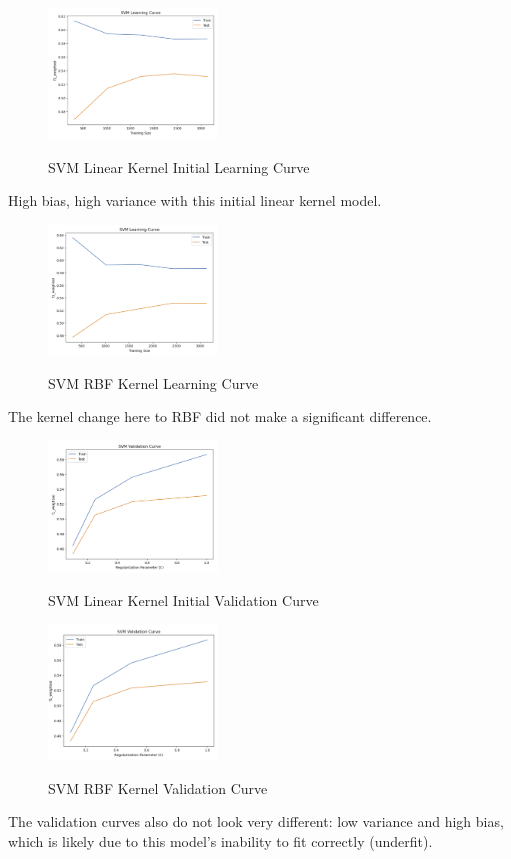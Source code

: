 \documentclass[conference]{IEEEtran}
\begin{document}
\begin{figure}[H]
    \centering
    \includegraphics[width=0.40\textwidth]{Red Wine Quality Graph Images/SVC/svm lin lc init.png}
    \label{fig:enter-label}
    \caption{SVM Linear Kernel Initial Learning Curve}
\end{figure}
High bias, high variance with this initial linear kernel model. 

\begin{figure}[H]
    \centering
    \includegraphics[width=0.40\textwidth]{Red Wine Quality Graph Images/SVC/svm rbf lc.png}
    \label{fig:enter-label}
    \caption{SVM RBF Kernel Learning Curve}
\end{figure}
The kernel change here to RBF did not make a significant difference.

\begin{figure}[H]
    \centering
    \includegraphics[width=0.40\textwidth]{Red Wine Quality Graph Images/SVC/svm lin vc init.png}
    \label{fig:enter-label}
    \caption{SVM Linear Kernel Initial Validation Curve}
\end{figure}

\begin{figure}[H]
    \centering
    \includegraphics[width=0.40\textwidth]{Red Wine Quality Graph Images/SVC/svm rbf vc.png}
    \label{fig:enter-label}
    \caption{SVM RBF Kernel Validation Curve}
\end{figure}
The validation curves also do not look very different: low variance and high bias, which is likely due to this model's inability to fit correctly (underfit). 
\end{document}
